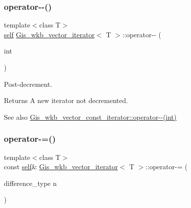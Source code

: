 \subsubsection{\texorpdfstring{operator-\/-\/()}{operator--()}\hspace{0.1cm}{\footnotesize\ttfamily [2/2]}}
{\footnotesize\ttfamily template$<$class T$>$ \\
\mbox{\hyperlink{classGis__wkb__vector__const__iterator}{self}} \mbox{\hyperlink{classGis__wkb__vector__iterator}{Gis\+\_\+wkb\+\_\+vector\+\_\+iterator}}$<$ T $>$\+::operator-\/-\/ (\begin{DoxyParamCaption}\item[{int}]{ }\end{DoxyParamCaption})\hspace{0.3cm}{\ttfamily [inline]}}



Post-\/decrement. 

\begin{DoxyReturn}{Returns}
A new iterator not decremented. 
\end{DoxyReturn}
\begin{DoxySeeAlso}{See also}
\mbox{\hyperlink{classGis__wkb__vector__const__iterator_a979655b875007b53d94dcf03065f88d8}{Gis\+\_\+wkb\+\_\+vector\+\_\+const\+\_\+iterator\+::operator-\/-\/(int)}} 
\end{DoxySeeAlso}
\mbox{\label{classGis__wkb__vector__iterator_ae2eb9ea30d4ce96a9b71abd90586133f}} 
\subsubsection{\texorpdfstring{operator-\/=()}{operator-=()}}
{\footnotesize\ttfamily template$<$class T$>$ \\
const \mbox{\hyperlink{classGis__wkb__vector__const__iterator}{self}}\& \mbox{\hyperlink{classGis__wkb__vector__iterator}{Gis\+\_\+wkb\+\_\+vector\+\_\+iterator}}$<$ T $>$\+::operator-\/= (\begin{DoxyParamCaption}\item[{difference\+\_\+type}]{n }\end{DoxyParamCaption})\hspace{0.3cm}{\ttfamily [inline]}}



